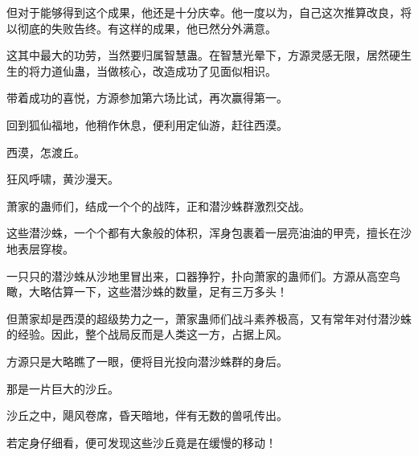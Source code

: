 \begin{this_body}
但对于能够得到这个成果，他还是十分庆幸。他一度以为，自己这次推算改良，将以彻底的失败告终。有这样的成果，他已然分外满意。

这其中最大的功劳，当然要归属智慧蛊。在智慧光晕下，方源灵感无限，居然硬生生的将力道仙蛊，当做核心，改造成功了见面似相识。

带着成功的喜悦，方源参加第六场比试，再次赢得第一。

回到狐仙福地，他稍作休息，便利用定仙游，赶往西漠。

西漠，怎渡丘。

狂风呼啸，黄沙漫天。

萧家的蛊师们，结成一个个的战阵，正和潜沙蛛群激烈交战。

这些潜沙蛛，一个个都有大象般的体积，浑身包裹着一层亮油油的甲壳，擅长在沙地表层穿梭。

一只只的潜沙蛛从沙地里冒出来，口器狰狞，扑向萧家的蛊师们。方源从高空鸟瞰，大略估算一下，这些潜沙蛛的数量，足有三万多头！

但萧家却是西漠的超级势力之一，萧家蛊师们战斗素养极高，又有常年对付潜沙蛛的经验。因此，整个战局反而是人类这一方，占据上风。

方源只是大略瞧了一眼，便将目光投向潜沙蛛群的身后。

那是一片巨大的沙丘。

沙丘之中，飓风卷席，昏天暗地，伴有无数的兽吼传出。

若定身仔细看，便可发现这些沙丘竟是在缓慢的移动！

\end{this_body}

